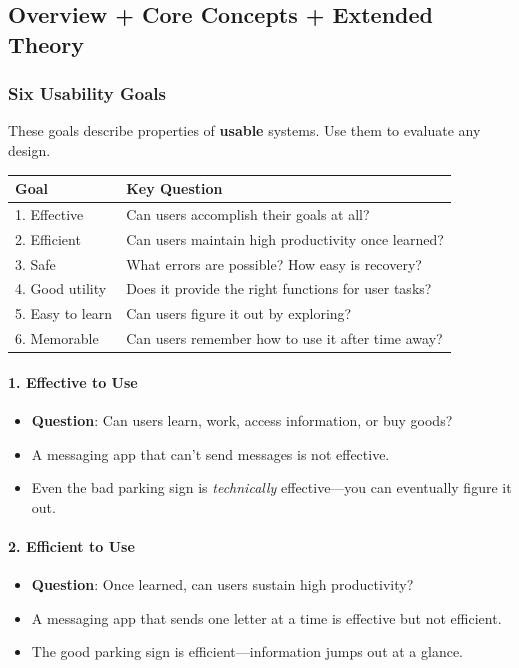 \subsection{Overview + Core Concepts + Extended Theory}

\subsubsection*{Six Usability Goals}

These goals describe properties of \textbf{usable} systems. Use them to evaluate any design.

\begin{center}
\renewcommand{\arraystretch}{1.4}
\begin{tabular}{@{} l p{8cm} @{}}
\toprule
\textbf{Goal} & \textbf{Key Question} \\
\midrule
1. Effective & Can users accomplish their goals at all? \\
2. Efficient & Can users maintain high productivity once learned? \\
3. Safe & What errors are possible? How easy is recovery? \\
4. Good utility & Does it provide the right functions for user tasks? \\
5. Easy to learn & Can users figure it out by exploring? \\
6. Memorable & Can users remember how to use it after time away? \\
\bottomrule
\end{tabular}
\end{center}

\paragraph*{1. Effective to Use}
\begin{itemize}
  \item \textbf{Question}: Can users learn, work, access information, or buy goods?
  \item A messaging app that can't send messages is not effective.
  \item Even the bad parking sign is \textit{technically} effective---you can eventually figure it out.
\end{itemize}

\paragraph*{2. Efficient to Use}
\begin{itemize}
  \item \textbf{Question}: Once learned, can users sustain high productivity?
  \item A messaging app that sends one letter at a time is effective but not efficient.
  \item The good parking sign is efficient---information jumps out at a glance.
\end{itemize}

